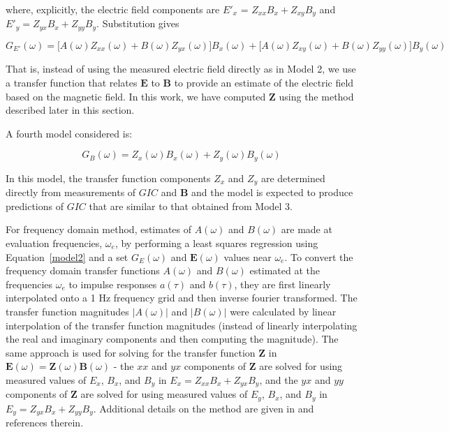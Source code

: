 \documentclass[draft,linenumbers]{agujournal2018}
\begin{document}
\noindent
where, explicitly, the electric field components are $E'_x$ = $Z_{xx}B_x + Z_{xy}B_y$ and $E'_y = Z_{yx}B_x + Z_{yy}B_y$. Substitution gives

\begin{equation*}
G_{E'}(\omega) = \big[A(\omega)Z_{xx}(\omega) + B(\omega)Z_{yx}(\omega) \big] B_x(\omega) + \big[ A(\omega)Z_{xy}(\omega) + B(\omega)Z_{yy}(\omega) \big] B_y(\omega)
\end{equation*}

That is, instead of using the measured electric field directly as in Model 2, we use a transfer function that relates $\mathbf{E}$ to $\mathbf{B}$ to provide an estimate of the electric field based on the magnetic field. In this work, we have computed $\mathbf{Z}$ using the method described later in this section.

A fourth model considered is:

\begin{linenomath*}
\begin{equation}
G_B(\omega) = Z_x(\omega)B_x(\omega) + Z_y(\omega)B_y(\omega)
\end{equation}
\end{linenomath*}

\noindent
In this model, the transfer function components $Z_x$ and $Z_y$ are determined directly from measurements of $GIC$ and $\mathbf{B}$ and the model is expected to produce predictions of $GIC$ that are similar to that obtained from Model 3.

For frequency domain method, estimates of $A(\omega)$ and $B(\omega)$ are made at evaluation frequencies, $\omega_e$, by performing a least squares regression using Equation~\ref{model2} and a set $G_E(\omega)$ and $\mathbf{E}(\omega)$ values near $\omega_e$. To convert the frequency domain transfer functions $A(\omega)$ and $B(\omega)$ estimated at the frequencies $\omega_e$ to impulse responses $a(\tau)$ and $b(\tau)$, they are first linearly interpolated onto a 1 Hz frequency grid and then inverse fourier transformed. The transfer function magnitudes $|A(\omega)|$ and $|B(\omega)|$ were calculated by linear interpolation of the transfer function magnitudes (instead of linearly interpolating the real and imaginary components and then computing the magnitude). The same approach is used for solving for the transfer function $\mathbf{Z}$ in $\mathbf{E}(\omega) = \mathbf{Z}(\omega)\mathbf{B}(\omega)$ - the $xx$ and $yx$ components of $\mathbf{Z}$ are solved for using measured values of $E_x$, $B_x$, and $B_y$ in $E_x = Z_{xx}B_x + Z_{yx}B_{y}$, and the $yx$ and $yy$ components of $\mathbf{Z}$ are solved for using measured values of $E_y$, $B_x$, and $B_y$ in $E_y = Z_{yx}B_x + Z_{yy}B_y$. Additional details on the method are given in \cite{Weigel2017} and references therein.
\end{document}
